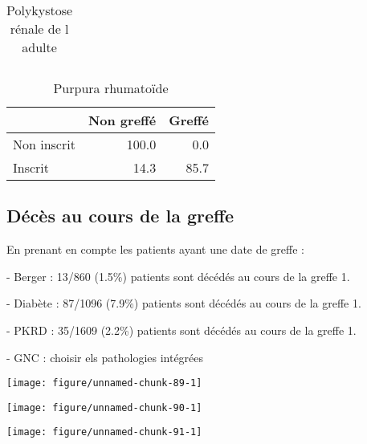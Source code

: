 \documentclass[11pt,a4paper]{article}\usepackage[]{graphicx}\usepackage[]{color}
\makeatletter
\def\maxwidth{ %
  \ifdim\Gin@nat@width>\linewidth
    \linewidth
  \else
    \Gin@nat@width
  \fi
}
\newenvironment{knitrout}{}{} %
\makeatother
\begin{document}
\begin{multicols}{2}
\begin{table}[H]
\begin{tabular}{lrr}
   \hline
\end{tabular}
\caption{Polykystose rénale de l adulte} 
\end{table}
\begin{table}[H]
\centering
\begin{tabular}{lrr}
  \hline
 & Non greffé & Greffé \\ 
  \hline
Non inscrit & 100.0 & 0.0 \\ 
  Inscrit & 14.3 & 85.7 \\ 
   \hline
\end{tabular}
\caption{Purpura rhumatoïde} 
\end{table}

\end{multicols}

  \subsection{Décès au cours de la greffe}

En prenant en compte les patients ayant une date de greffe :

- Berger : 13/860 (1.5\%) patients sont décédés au cours de la greffe 1.

- Diabète : 87/1096 (7.9\%) patients sont décédés au cours de la greffe 1.

- PKRD : 35/1609 (2.2\%) patients sont décédés au cours de la greffe 1.

- GNC : choisir els pathologies intégrées

\begin{knitrout}
\color{fgcolor}
\texttt{[image: figure/unnamed-chunk-89-1]} 

\end{knitrout}


\begin{knitrout}
\color{fgcolor}
\texttt{[image: figure/unnamed-chunk-90-1]} 

\end{knitrout}


\begin{knitrout}
\color{fgcolor}
\texttt{[image: figure/unnamed-chunk-91-1]} 

\end{knitrout}
\end{document}
